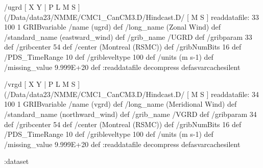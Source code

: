 \begin{ingrid}
/ugrd {
[ X Y | P L M S ]
(/Data/data23/NMME/CMC1_CanCM3.D/Hindcast.D/%
[ M S ]
readdatafile:
33 100 1 GRIBvariable 
/name (ugrd) def
/long_name (Zonal Wind) def
/standard_name (eastward_wind) def
/grib_name /UGRD def
/gribparam 33 def
/gribcenter 54 def
/center (Montreal (RSMC)) def
/gribNumBits 16 def
/PDS_TimeRange 10 def
/gribleveltype 100 def
/units (m s-1) def
/missing_value 9.999E+20 def
:readdatafile decompress
} defasvarcachesilent

/vrgd {
[ X Y | P L M S ]
(/Data/data23/NMME/CMC1_CanCM3.D/Hindcast.D/%
[ M S ]
readdatafile:
34 100 1 GRIBvariable 
/name (vgrd) def
/long_name (Meridional Wind) def
/standard_name (northward_wind) def
/grib_name /VGRD def
/gribparam 34 def
/gribcenter 54 def
/center (Montreal (RSMC)) def
/gribNumBits 16 def
/PDS_TimeRange 10 def
/gribleveltype 100 def
/units (m s-1) def
/missing_value 9.999E+20 def
:readdatafile decompress
} defasvarcachesilent

:dataset
\end{ingrid}
